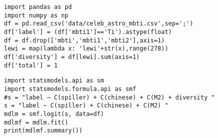 \documentclass[12pt,fleqn]{article}\usepackage{../common}
\begin{document}
\begin{verbatim}
import pandas as pd
import numpy as np
df = pd.read_csv('data/celeb_astro_mbti.csv',sep=';')
df['label'] = (df['mbti1']=='Ti').astype(float)
df = df.drop(['mbti','mbti1','mbti2'],axis=1)
lewi = map(lambda x: 'lewi'+str(x),range(278))
df['diversity'] = df[lewi].sum(axis=1)
df['total'] = 1
\end{verbatim}


\begin{verbatim}
import statsmodels.api as sm
import statsmodels.formula.api as smf
#s = "label ~ C(spiller) + C(chinese) + C(M2) + diversity "
s = "label ~ C(spiller) + C(chinese) + C(M2) "
mdlm = smf.logit(s, data=df)
mdlmf = mdlm.fit()
print(mdlmf.summary())
\end{verbatim}
\end{document}
